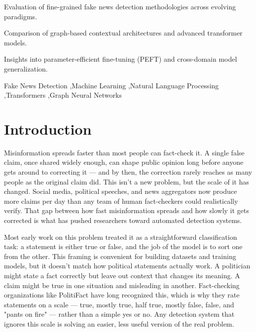 \documentclass[a4paper,fleqn]{cas-sc}
\begin{document}
\begin{highlights}
\item Evaluation of fine-grained fake news detection methodologies across evolving paradigms.
\item Comparison of graph-based contextual architectures and advanced transformer models.
\item Insights into parameter-efficient fine-tuning (PEFT) and cross-domain model generalization.
\end{highlights}

\begin{keywords}
Fake News Detection \sep Machine Learning \sep Natural Language Processing \sep Transformers \sep Graph Neural Networks
\end{keywords}

\maketitle

\section{Introduction}\label{sec:intro}
Misinformation spreads faster than most people can fact-check it. A single false claim, once shared widely enough, can shape public opinion long before anyone gets around to correcting it — and by then, the correction rarely reaches as many people as the original claim did. This isn't a new problem, but the scale of it has changed. Social media, political speeches, and news aggregators now produce more claims per day than any team of human fact-checkers could realistically verify. That gap between how fast misinformation spreads and how slowly it gets corrected is what has pushed researchers toward automated detection systems.

Most early work on this problem treated it as a straightforward classification task: a statement is either true or false, and the job of the model is to sort one from the other. This framing is convenient for building datasets and training models, but it doesn't match how political statements actually work. A politician might state a fact correctly but leave out context that changes its meaning. A claim might be true in one situation and misleading in another. Fact-checking organizations like PolitiFact have long recognized this, which is why they rate statements on a scale — true, mostly true, half true, mostly false, false, and "pants on fire" — rather than a simple yes or no. Any detection system that ignores this scale is solving an easier, less useful version of the real problem.
\end{document}
